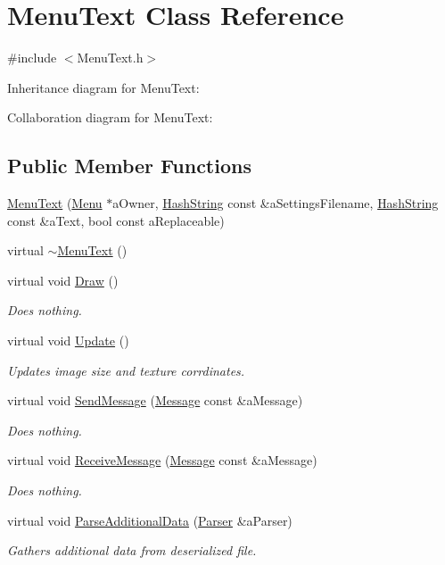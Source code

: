 \hypertarget{classMenuText}{}\section{Menu\+Text Class Reference}
\label{classMenuText}


{\ttfamily \#include $<$Menu\+Text.\+h$>$}



Inheritance diagram for Menu\+Text\+:


Collaboration diagram for Menu\+Text\+:
\subsection*{Public Member Functions}
\begin{DoxyCompactItemize}
\item 
\hyperlink{classMenuText_af5eaf7e9c7995cb396068a3cb959b312}{Menu\+Text} (\hyperlink{classMenu}{Menu} $\ast$a\+Owner, \hyperlink{classHashString}{Hash\+String} const \&a\+Settings\+Filename, \hyperlink{classHashString}{Hash\+String} const \&a\+Text, bool const a\+Replaceable)
\item 
virtual \hyperlink{classMenuText_a9579d3b71d3ceb48dd1b775e87e94650}{$\sim$\+Menu\+Text} ()
\item 
virtual void \hyperlink{classMenuText_a945413780140cb8e4a87062df94790c7}{Draw} ()
\begin{DoxyCompactList}\small\item\em Does nothing. \end{DoxyCompactList}\item 
virtual void \hyperlink{classMenuText_a701fec41c17d3f3fb03a4a0dad97322c}{Update} ()
\begin{DoxyCompactList}\small\item\em Updates image size and texture corrdinates. \end{DoxyCompactList}\item 
virtual void \hyperlink{classMenuText_aa4534efb2d3a10cd1e198a46f44e5889}{Send\+Message} (\hyperlink{classMessage}{Message} const \&a\+Message)
\begin{DoxyCompactList}\small\item\em Does nothing. \end{DoxyCompactList}\item 
virtual void \hyperlink{classMenuText_af4c888676ab8157c074818b6a72e0d79}{Receive\+Message} (\hyperlink{classMessage}{Message} const \&a\+Message)
\begin{DoxyCompactList}\small\item\em Does nothing. \end{DoxyCompactList}\item 
virtual void \hyperlink{classMenuText_a525952bf85ab278fa87e61a1d99ebe46}{Parse\+Additional\+Data} (\hyperlink{classParser}{Parser} \&a\+Parser)
\begin{DoxyCompactList}\small\item\em Gathers additional data from deserialized file. \end{DoxyCompactList}\end{DoxyCompactItemize}
